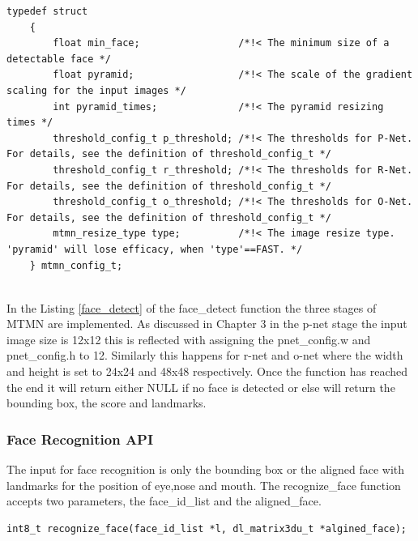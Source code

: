 \begin{lstlisting}[caption={MTMN configurations },label=mtmn, captionpos=b]
 typedef struct
    {
        float min_face;                 /*!< The minimum size of a detectable face */
        float pyramid;                  /*!< The scale of the gradient scaling for the input images */
        int pyramid_times;              /*!< The pyramid resizing times */
        threshold_config_t p_threshold; /*!< The thresholds for P-Net. For details, see the definition of threshold_config_t */
        threshold_config_t r_threshold; /*!< The thresholds for R-Net. For details, see the definition of threshold_config_t */
        threshold_config_t o_threshold; /*!< The thresholds for O-Net. For details, see the definition of threshold_config_t */
        mtmn_resize_type type;          /*!< The image resize type. 'pyramid' will lose efficacy, when 'type'==FAST. */
    } mtmn_config_t;
    
\end{lstlisting}

In the Listing \ref{face_detect}  of the {\selectfont face\_detect} function the three stages of MTMN are implemented. As discussed in Chapter 3 in the p-net stage the input image size is 12x12 this is reflected with assigning the {\selectfont pnet\_config.w} and {\selectfont pnet\_config.h} to 12. Similarly this happens for r-net and o-net where the width and height is set to 24x24 and 48x48 respectively. Once the function has reached the end it will return either NULL if no face is detected or else will return the bounding box, the score and landmarks.


\subsubsection{Face Recognition API} 

The input for face recognition is only the bounding box or the aligned face with landmarks for the position of eye,nose and mouth. The {\selectfont recognize\_face} function accepts two parameters, the {\selectfont face\_id\_list} and the {\selectfont aligned\_face}.
\begin{lstlisting}[caption={Face Recognition API},label=face_rec, captionpos=b]
int8_t recognize_face(face_id_list *l, dl_matrix3du_t *algined_face);
\end{lstlisting}

